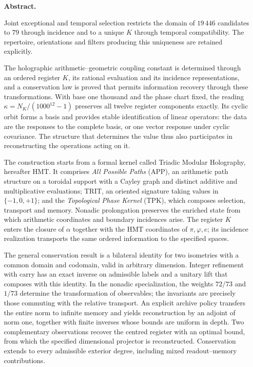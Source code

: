 \clearpage
\noindent\textbf{Abstract.}\par\smallskip
Joint exceptional and temporal selection restricts the domain of \(19\,446\) candidates to \(79\) through incidence and to a unique \(K\) through temporal compatibility. The repertoire, orientations and filters producing this uniqueness are retained explicitly.

The holographic arithmetic--geometric coupling constant is determined through an ordered register \(K\), its rational evaluation and its incidence representations, and a conservation law is proved that permits information recovery through these transformations. With base one thousand and the phase chart fixed, the reading \(\kappa=N_K/(1000^{12}-1)\) preserves all twelve register components exactly. Its cyclic orbit forms a basis and provides stable identification of linear operators: the data are the responses to the complete basis, or one vector response under cyclic covariance. The structure that determines the value thus also participates in reconstructing the operations acting on it.

The construction starts from a formal kernel called Triadic Modular Holography, hereafter HMT. It comprises \emph{All Possible Paths} (APP), an arithmetic path structure on a toroidal support with a Cayley graph and distinct additive and multiplicative evaluations; TRIT, an oriented signature taking values in \(\{-1,0,+1\}\); and the \emph{Topological Phase Kernel} (TPK), which composes selection, transport and memory. Nonadic prolongation preserves the enriched state from which arithmetic coordinates and boundary incidences arise. The register \(K\) enters the closure of \(\alpha\) together with the HMT coordinates of \(\pi,\varphi,e\); its incidence realization transports the same ordered information to the specified spaces.

The general conservation result is a bilateral identity for two isometries with a common domain and codomain, valid in arbitrary dimension. Integer refinement with carry has an exact inverse on admissible labels and a unitary lift that composes with this identity. In the nonadic specialization, the weights \(72/73\) and \(1/73\) determine the transformation of observables; the invariants are precisely those commuting with the relative transport. An explicit archive policy transfers the entire norm to infinite memory and yields reconstruction by an adjoint of norm one, together with finite inverses whose bounds are uniform in depth. Two complementary observations recover the centred register with an optimal bound, from which the specified dimensional projector is reconstructed. Conservation extends to every admissible exterior degree, including mixed readout--memory contributions.


